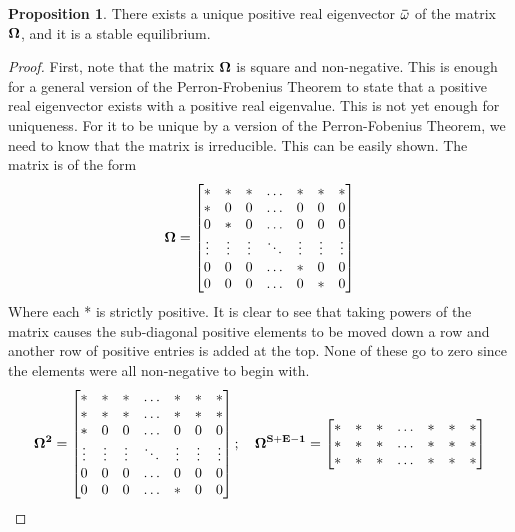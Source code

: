 \documentclass[letterpaper,12pt]{article}
\theoremstyle{definition}
\newtheorem{proposition}{Proposition} %
\begin{document}
  \begin{proposition}
    There exists a unique positive real eigenvector $\bf\bar\omega$ of the matrix $\bf\Omega$, and it is a stable equilibrium.
  \end{proposition}

  \begin{proof}
    First, note that the matrix $\bf\Omega$ is square and non-negative.  This is enough for a general version of the Perron-Frobenius Theorem to state that a positive real eigenvector exists with a positive real eigenvalue.  This is not yet enough for uniqueness.  For it to be unique by a version of the Perron-Fobenius Theorem, we need to know that the matrix is irreducible.  This can be easily shown.  The matrix is of the form
    $$\bf\Omega =
    \begin{bmatrix}
    	* & *  & * & \hdots & * & * & *\\
    	* & 0 & 0 & \hdots & 0 & 0 & 0 \\
    	0 & * & 0 & \hdots & 0 & 0 & 0 \\
    	\vdots & \vdots & \vdots & \ddots & \vdots & \vdots & \vdots \\
    	0 & 0 & 0 & \hdots & *  & 0 & 0 \\
    	0 & 0 & 0 & \hdots & 0 & * & 0
    \end{bmatrix}
    $$
    Where each * is strictly positive.  It is clear to see that taking powers of the matrix causes the sub-diagonal positive elements to be moved down a row and another row of positive entries is added at the top.  None of these go to zero since the elements were all non-negative to begin with.
    $$\bf\Omega^2 =
    \begin{bmatrix}
    	* & *  & * & \hdots & * & * & *\\
    	* & * & * & \hdots & * & * & * \\
    	* & 0 & 0 & \hdots & 0 & 0 & 0 \\
    	\vdots & \vdots & \vdots & \ddots & \vdots & \vdots & \vdots \\
    	0 & 0 & 0 & \hdots & 0  & 0 & 0 \\
    	0 & 0 & 0 & \hdots & * & 0 & 0
    \end{bmatrix}; ~~~
    \bf\Omega^{S+E-1} =
    \begin{bmatrix}
    	* & *  & * & \hdots & * & * & *\\
    	* & * & * & \hdots & * & * & * \\
    	* & * & * & \hdots & * & * & * \\

\end{bmatrix}$$
\end{proof}
\end{document}

